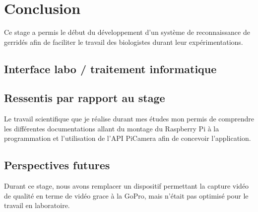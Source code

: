 \chapter{Conclusion}
    Ce stage a permis le début du développement d'un système de reconnaissance de gerridés afin de faciliter le travail des biologistes durant leur expérimentations.
    
    \section{Interface labo / traitement informatique}
    
    \section{Ressentis par rapport au stage}
    Le travail scientifique que je réalise durant mes études mon permis de comprendre les différentes documentations allant du montage du Raspberry Pi à la programmation et l'utilisation de l'API PiCamera afin de concevoir l'application. 







    \section{Perspectives futures}
    Durant ce stage, nous avons remplacer un dispositif permettant la capture vidéo de qualité en terme de vidéo grace à la GoPro, mais n'était pas optimisé pour le travail en laboratoire.

